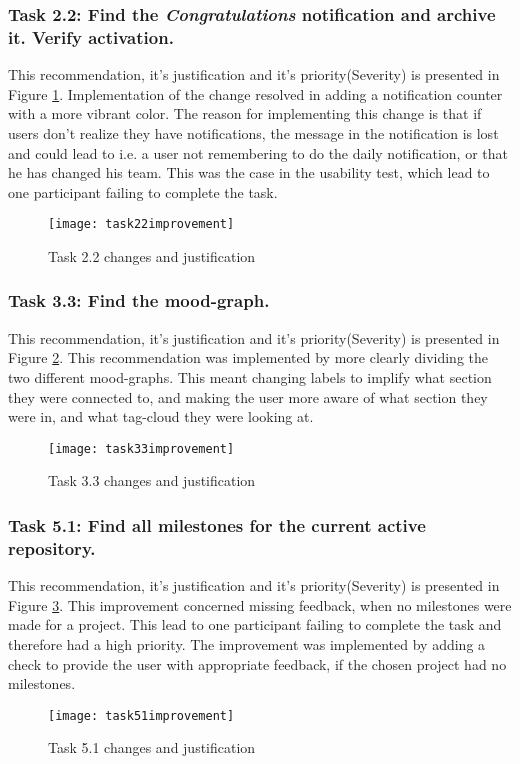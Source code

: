 \subsubsection*{Task 2.2: Find the \emph{Congratulations} notification and archive it. Verify activation.}
This recommendation, it's justification and it's priority(Severity) is presented in Figure \ref{task22improvement}. 
Implementation of the change resolved in adding a notification counter with a more vibrant color. The reason for implementing this change is that if users don't realize they have notifications, the message in the notification is lost and could lead to i.e. a user not remembering to do the daily notification, or that he has changed his team. This was the case in the usability test, which lead to one participant failing to complete the task. 
\begin{figure}[H]
    \centering
        \texttt{[image: task22improvement]}
    \caption{Task 2.2 changes and justification}
    \label{task22improvement}
\end{figure}

\subsubsection*{Task 3.3: Find the mood-graph.} 
This recommendation, it's justification and it's priority(Severity) is presented in Figure \ref{task33improvement}. 
This recommendation was implemented by more clearly dividing the two different mood-graphs. This meant changing labels to implify what section they were connected to, and making the user more aware of what section they were in, and what tag-cloud they were looking at. 
\begin{figure}[h!]
    \centering
        \texttt{[image: task33improvement]}
    \caption{Task 3.3 changes and justification}
    \label{task33improvement}
\end{figure}

\subsubsection*{Task 5.1: Find all milestones for the current active repository.}
This recommendation, it's justification and it's priority(Severity) is presented in Figure \ref{task51improvement}. This improvement concerned missing feedback, when no milestones were made for a project. This lead to one participant failing to complete the task and therefore had a high priority. The improvement was implemented by adding a check to provide the user with appropriate feedback, if the chosen project had no milestones. 
\begin{figure}[h!]
    \centering
        \texttt{[image: task51improvement]}
    \caption{Task 5.1 changes and justification}
    \label{task51improvement}
\end{figure}

